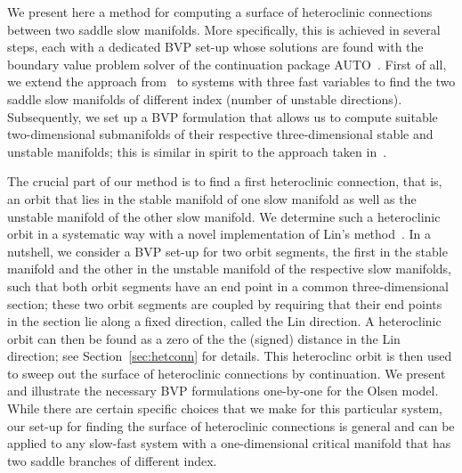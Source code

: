 \documentclass{ws-ijbc}
\begin{document}
We present here a method for computing a surface of heteroclinic connections between two saddle slow manifolds. More specifically, this is achieved in several steps, each with a dedicated BVP set-up whose solutions are found with the boundary value problem solver of the continuation package \textsc{AUTO}~\cite{autoOriginal, auto}. First of all, we extend the approach from~\cite{Saeed_Paper} to systems with three fast variables to find the two saddle slow manifolds of different index (number of unstable directions). Subsequently, we set up a BVP formulation that allows us to compute suitable two-dimensional submanifolds of their respective three-dimensional stable and unstable manifolds; this is similar in spirit to the approach taken in~\cite{Cris_paper}.

The crucial part of our method is to find a first heteroclinic connection, that is, an orbit that lies in the stable manifold of one slow manifold as well as the unstable manifold of the other slow manifold. We determine such a heteroclinic orbit in a systematic way with a novel implementation of Lin's method~\cite{Lin_original, Lin_POs, Lin_POs2}. In a nutshell, we consider a BVP set-up for two orbit segments, the first in the stable manifold and the other in the unstable manifold of the respective slow manifolds, such that both orbit segments have an end point in a common three-dimensional section; these two orbit segments are coupled by requiring that their end points in the section lie along a fixed direction, called the Lin direction. A heteroclinic orbit can then be found as a zero of the the (signed) distance in the Lin direction; see Section~\ref{sec:hetconn} for details. This heteroclinc orbit is then used to sweep out the surface of heteroclinic connections by continuation. We present and illustrate the necessary BVP formulations one-by-one for the Olsen model. While there are certain specific choices that we make for this particular system, our set-up for finding the surface of heteroclinic connections is general and can be applied to any slow-fast system with a one-dimensional critical manifold that has two saddle branches of different index.
\end{document}
